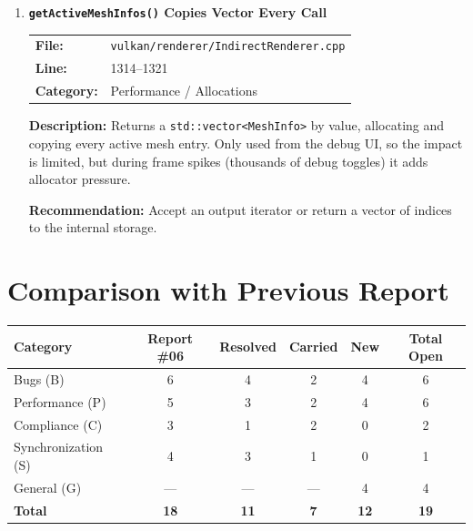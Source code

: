 \documentclass[a4paper,12pt]{article}
\newcommand{\severitybox}[2]{%
  \colorbox{#1}{\makebox[2.5cm][c]{\textcolor{white}{\textbf{#2}}}}%
}
\begin{document}
\begin{enumerate}[leftmargin=*]
  \textbf{Recommendation:}
  Remove the second \texttt{return}.

\item[\textbf{[P12]}] \textbf{\texttt{getActiveMeshInfos()} Copies Vector Every Call}
  \hfill \severitybox{lowcolor}{LOW}

  \begin{tabular}{ll}
    \textbf{File:} & \texttt{vulkan/renderer/IndirectRenderer.cpp} \\
    \textbf{Line:} & 1314--1321 \\
    \textbf{Category:} & Performance / Allocations \\
  \end{tabular}

  \textbf{Description:}
  Returns a \texttt{std::vector<MeshInfo>} by value, allocating and copying
  every active mesh entry. Only used from the debug UI, so the impact is
  limited, but during frame spikes (thousands of debug toggles) it adds
  allocator pressure.

  \textbf{Recommendation:}
  Accept an output iterator or return a vector of indices to the internal
  storage.

\end{enumerate}

\newpage

\section{Comparison with Previous Report}

\begin{center}
\begin{tabular}{lccccc}
\toprule
\textbf{Category} & \textbf{Report \#06} & \textbf{Resolved} & \textbf{Carried} & \textbf{New} & \textbf{Total Open} \\
\midrule
Bugs (B)           & 6  & 4 & 2  & 4 & 6  \\
Performance (P)    & 5  & 3 & 2  & 4 & 6  \\
Compliance (C)     & 3  & 1 & 2  & 0 & 2  \\
Synchronization (S)& 4  & 3 & 1  & 0 & 1  \\
General (G)        & —  & — & —  & 4 & 4  \\
\midrule
\textbf{Total}     & \textbf{18} & \textbf{11} & \textbf{7} & \textbf{12} & \textbf{19} \\
\bottomrule
\end{tabular}
\end{center}
\end{document}
